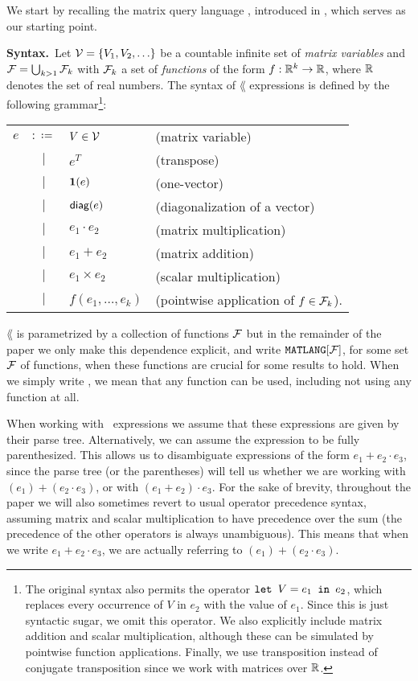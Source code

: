 
We start by recalling the matrix query language \lang, introduced in \cite{matlang-journal}, which serves as our starting point.

\smallskip
\noindent
\textbf{Syntax.}\,  Let $\mathcal{V} = \{V_1, V_2, \ldots\}$ be a countable infinite set of \textit{matrix variables} and $\mathcal{F}=\bigcup_{k>1}\mathcal{F}_k$ with $\mathcal{F}_k$ a set of \textit{functions} of the  form $f:\mathbb{R}^k \to \mathbb{R}$, where $\mathbb{R}$ denotes the set of real numbers. The syntax of $\lang$ expressions is defined by the following grammar\footnote{The original syntax also permits the operator $\texttt{let } V = e_1 \texttt{ in } e_2$, which replaces every occurrence of $V$ in $e_2$ with the value of $e_1$. Since this is just syntactic sugar, we omit this operator. We also explicitly include matrix addition and scalar multiplication, although these can be simulated by pointwise function applications. Finally, we use transposition instead of conjugate transposition since we work with matrices over $\mathbb{R}$.}:


\begin{tabular}{lcll}
$e$ & $:\coloneqq $ & $V\in \mathcal{V}$ & (matrix variable)\\
 & $|$ & $e^T$ & (transpose)\\ 
 & $|$ & $\mathbf{1}(e)$ & (one-vector)\\ 
 & $|$ & $\textsf{diag}(e)$ & (diagonalization of a vector)\\  
 & $|$ & $e_1 \cdot e_2$ & (matrix multiplication)\\   
 & $|$ & $e_1 + e_2$ & (matrix addition)\\   
 & $|$ & $e_1\times e_2$ & (scalar multiplication)\\
 & $|$ & $f(e_1,\ldots ,e_k)$ & (pointwise application of $f\in\mathcal{F}_k$).    
\end{tabular}
\vspace{1ex}

$\lang$ is parametrized by a collection of functions $\mathcal{F}$ but in the remainder of the paper we only make this dependence explicit, and write $\texttt{MATLANG}[\mathcal{F}]$, for some set $\mathcal{F}$ of functions, when these functions are crucial for some results to hold. When we simply write \lang, we mean that any function can be used, including not using any function at all.

When working with \lang\ expressions we assume that these expressions are given by their parse tree. Alternatively, we can assume the expression to be fully parenthesized. This allows us to disambiguate expressions of the form $e_1+ e_2\cdot e_3$, since the parse tree (or the parentheses) will tell us whether we are working with $(e_1) + (e_2\cdot e_3)$, or with $(e_1+e_2)\cdot e_3$. For the sake of brevity, throughout the paper we will also sometimes revert to usual operator precedence syntax, assuming matrix and scalar multiplication to have precedence over the sum (the precedence of the other operators is always unambiguous). This means that when we write $e_1 + e_2\cdot e_3$, we are actually referring to $(e_1) + (e_2\cdot e_3)$.

